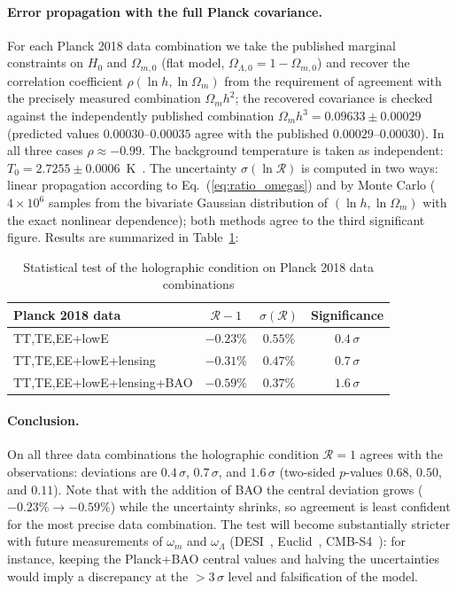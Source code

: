\documentclass[10pt,a4paper]{article}
\begin{document}
\paragraph{Error propagation with the full Planck covariance.}
For each Planck 2018 data combination we take the published marginal constraints on $H_0$ and $\Omega_{m,0}$ (flat model, $\Omega_{\Lambda,0}=1-\Omega_{m,0}$) and recover the correlation coefficient $\rho(\ln h, \ln\Omega_m)$ from the requirement of agreement with the precisely measured combination $\Omega_m h^2$; the recovered covariance is checked against the independently published combination $\Omega_m h^3 = 0.09633 \pm 0.00029$ (predicted values $0.00030$--$0.00035$ agree with the published $0.00029$--$0.00030$). In all three cases $\rho \approx -0.99$. The background temperature is taken as independent: $T_0 = 2.7255 \pm 0.0006$~K~\cite{Fixsen2009}. The uncertainty $\sigma(\ln\mathcal{R})$ is computed in two ways: linear propagation according to Eq.~(\ref{eq:ratio_omegas}) and by Monte Carlo ($4\times10^6$ samples from the bivariate Gaussian distribution of $(\ln h, \ln\Omega_m)$ with the exact nonlinear dependence); both methods agree to the third significant figure. Results are summarized in Table~\ref{tab:planck}:

\begin{table}[htbp]
\centering
\caption{Statistical test of the holographic condition on Planck 2018 data combinations}
\label{tab:planck}
\begin{tabular}{l c c c}
\hline
Planck 2018 data & $\mathcal{R}-1$ & $\sigma(\mathcal{R})$ & Significance \\
\hline
TT,TE,EE+lowE & $-0.23\%$ & $0.55\%$ & $0.4\,\sigma$ \\
TT,TE,EE+lowE+lensing & $-0.31\%$ & $0.47\%$ & $0.7\,\sigma$ \\
TT,TE,EE+lowE+lensing+BAO & $-0.59\%$ & $0.37\%$ & $1.6\,\sigma$ \\
\hline
\end{tabular}
\end{table}

\paragraph{Conclusion.}
On all three data combinations the holographic condition $\mathcal{R}=1$ agrees with the observations: deviations are $0.4\,\sigma$, $0.7\,\sigma$, and $1.6\,\sigma$ (two-sided $p$-values $0.68$, $0.50$, and $0.11$). Note that with the addition of BAO the central deviation grows ($-0.23\% \to -0.59\%$) while the uncertainty shrinks, so agreement is least confident for the most precise data combination. The test will become substantially stricter with future measurements of $\omega_m$ and $\omega_\Lambda$ (DESI~\cite{DESI2024SV}, Euclid~\cite{Laureijs2011,Euclid2020}, CMB-S4~\cite{Abazajian2016}): for instance, keeping the Planck+BAO central values and halving the uncertainties would imply a discrepancy at the $>3\,\sigma$ level and falsification of the model.
\end{document}
